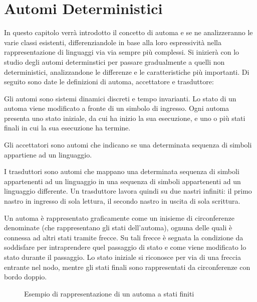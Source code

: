 \chapter{Automi Deterministici}
  In questo capitolo verrà introdotto il concetto di automa e se ne analizzeranno le varie classi esistenti, differenziandole in base alla loro espressività nella rappresentazione di linguaggi via via sempre più complessi. Si inizierà con lo studio degli automi determinstici per passare gradualmente a quelli non deterministici, analizzandone le differenze e le caratteristiche più importanti. Di seguito sono date le definizioni di automa, accettatore e trasduttore:

  \begin{definition}
    Gli automi sono sistemi dinamici discreti e tempo invarianti. Lo stato di un automa viene modificato a fronte di un simbolo di ingresso. Ogni automa presenta uno stato iniziale, da cui ha inizio la sua esecuzione, e uno o più stati finali in cui la sua esecuzione ha termine. 
  \end{definition}

  \begin{definition}
    Gli accettatori sono automi che indicano se una determinata sequenza di simboli appartiene ad un linguaggio.    
  \end{definition}

  \begin{definition}
    I trasduttori sono automi che mappano una determinata sequenza di simboli appartenenti ad un linguaggio in una sequenza di simboli appartenenti ad un linguaggio differente. Un trasduttore lavora quindi su due nastri infiniti:
    il primo nastro in ingresso di sola lettura, il secondo nastro in uscita di sola scrittura. 
  \end{definition}

  Un automa è rappresentato graficamente come un inisieme di circonferenze denominate (che rappresentano gli stati dell'automa), ognuna delle quali è connessa ad altri stati tramite frecce. Su tali frecce è segnata la condizione da soddisfare per intraprendere quel passaggio di stato e come viene modificato lo stato durante il passaggio. Lo stato iniziale si riconosce per via di una freccia entrante nel nodo, mentre gli stati finali sono rappresentati da circonferenze con bordo doppio. 

  \begin{figure}[h!]
    \begin{center}
    \end{center}
    \caption{Esempio di rappresentazione di un automa a stati finiti}
  \end{figure}


